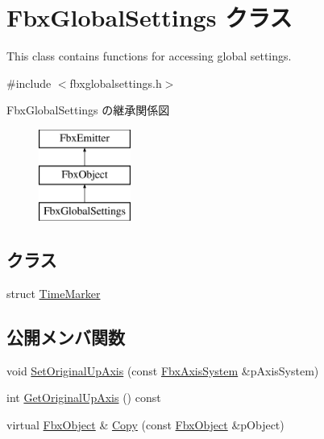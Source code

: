 \hypertarget{class_fbx_global_settings}{}\section{Fbx\+Global\+Settings クラス}
\label{class_fbx_global_settings}


This class contains functions for accessing global settings.  




{\ttfamily \#include $<$fbxglobalsettings.\+h$>$}

Fbx\+Global\+Settings の継承関係図\begin{figure}[H]
\begin{center}
\leavevmode
\includegraphics[height=3.000000cm]{class_fbx_global_settings}
\end{center}
\end{figure}
\subsection*{クラス}
\begin{DoxyCompactItemize}
\item 
struct \hyperlink{struct_fbx_global_settings_1_1_time_marker}{Time\+Marker}
\end{DoxyCompactItemize}
\subsection*{公開メンバ関数}
\begin{DoxyCompactItemize}
\item 
void \hyperlink{class_fbx_global_settings_af82679ae7c4df3249e547f6d18be9c19}{Set\+Original\+Up\+Axis} (const \hyperlink{class_fbx_axis_system}{Fbx\+Axis\+System} \&p\+Axis\+System)
\item 
int \hyperlink{class_fbx_global_settings_a6d55cf87bc48c0746c28b4d421db6381}{Get\+Original\+Up\+Axis} () const
\item 
virtual \hyperlink{class_fbx_object}{Fbx\+Object} \& \hyperlink{class_fbx_global_settings_aa44ceae4a448e0abd0b17b869f328e2f}{Copy} (const \hyperlink{class_fbx_object}{Fbx\+Object} \&p\+Object)
\end{DoxyCompactItemize}
